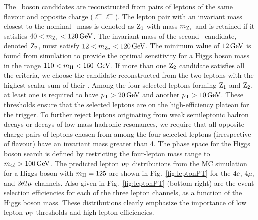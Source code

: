 \documentclass[11pt,twoside,a4paper,cmspaper,final,collab]{cms-tdr}
\begin{document}
The \cPZ\ boson candidates are reconstructed from pairs of leptons of the same
flavour and opposite charge ($\ell^+\ell^-$).
The lepton pair with an invariant mass closest to the nominal \cPZ\  mass is denoted
as $\mathrm{Z}_1$ with mass $m_{\mathrm{Z}_1}$ and is retained if it satisfies $40 < m_{\mathrm{Z}_1} < 120\,\text{Ge\hspace{-.08em}V}$.
The invariant mass of the second \cPZ\ candidate, denoted $\mathrm{Z}_2$,
must satisfy
$12 < m_{\mathrm{Z}_2} < 120\,\text{Ge\hspace{-.08em}V}$.
The minimum value of $12\,\text{Ge\hspace{-.08em}V}$ is found from simulation to provide  the optimal sensitivity for a Higgs boson mass
in the range $ 110 < m_{\mathrm{H}} < 160~\,\text{Ge\hspace{-.08em}V}$.
If more than one ${\mathrm{Z}_2}$ candidate satisfies all the criteria, we choose
the candidate reconstructed from the
two leptons with the highest scalar sum of their \PT.
Among the four selected leptons forming $\mathrm{Z}_1$ and $\mathrm{Z}_2$,
at least one is required to have $p_{\mathrm{T}} > 20\,\text{Ge\hspace{-.08em}V}$ and another
$p_{\mathrm{T}} > 10\,\text{Ge\hspace{-.08em}V}$.
These \PT thresholds ensure that the selected leptons
are on the high-efficiency plateau for the trigger.
To further reject leptons originating from weak semileptonic hadron decays
or decays of low-mass hadronic resonances, we require that all
opposite-charge pairs of leptons chosen from among the four selected leptons (irrespective of flavour)
have an invariant mass greater than  4\GeV.
The phase space for the Higgs boson search is defined by restricting the four-lepton
mass range to $m_{4\ell} > 100\,\text{Ge\hspace{-.08em}V}$.
The predicted lepton $p_{\mathrm{T}}$ distributions from the  MC simulation for a Higgs boson with  $m_{\mathrm{H}} = 125$\GeV
are shown in Fig.~\ref{fig:leptonPT} for the $4\mathrm{e}$, $4\mu$, and $2\mathrm{e} 2\mu$ channels.
Also given in Fig.~\ref{fig:leptonPT}  (bottom right) are the event selection efficiencies   for each
of the three lepton channels, as a function of the Higgs boson mass.
These distributions clearly emphasize the importance of low lepton-$p_{\mathrm{T}}$ thresholds and high
lepton efficiencies.
\end{document}
